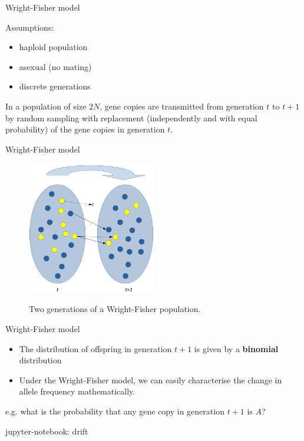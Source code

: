 \begin{frame}{Wright-Fisher model}

	Assumptions:
	\begin{itemize}
		\item haploid population
		\item asexual (no mating)
		\item discrete generations
	\end{itemize}

	\begin{block}{}
	In a population of size $2N$, gene copies are transmitted from generation $t$ to $t+1$ by
	random sampling with replacement (independently and with equal probability) of the gene
	copies in generation $t$.
	\end{block}

\end{frame}


\begin{frame}{Wright-Fisher model}

	\begin{figure}
        	\includegraphics[width=0.5\textwidth]{Pics/wf} \\
                \caption{Two generations of a Wright-Fisher population.}
        \end{figure}

\end{frame}


\begin{frame}{Wright-Fisher model}

	\begin{itemize}
		\item The distribution of offspring in generation $t+1$ is given by a \textbf{binomial} distribution
		\item Under the Wright-Fisher model, we can easily characterise the change in allele frequency mathematically.
	\end{itemize}

	\small
	e.g. what is the probability that any gene copy in generation $t+1$ is $A$?

	\bigskip
	\tiny{jupyter-notebook: drift}

\end{frame}


